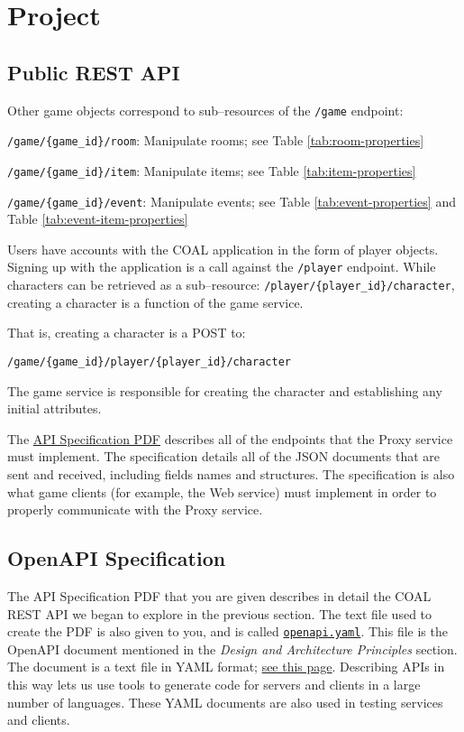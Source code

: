\documentclass{article}
\newcommand{\enterProblemHeader}[1]{
}
\newcommand{\exitProblemHeader}[1]{
\nobreak\extramarks{#1}{}\nobreak
}
\newcounter{homeworkProblemCounter} %
\newcommand{\homeworkProblemName}{}
\newenvironment{homeworkProblem}[1][Problem \arabic{homeworkProblemCounter}]{ %
\stepcounter{homeworkProblemCounter} %
\renewcommand{\homeworkProblemName}{#1} %
\section{\homeworkProblemName} %
\enterProblemHeader{\homeworkProblemName} %
}{
\exitProblemHeader{\homeworkProblemName} %
}
\newcommand{\homeworkSectionName}{}
\newenvironment{homeworkSection}[1]{ %
\renewcommand{\homeworkSectionName}{#1} %
\subsection{\homeworkSectionName} %
\enterProblemHeader{\homeworkProblemName\ [\homeworkSectionName]} %
}{
\enterProblemHeader{\homeworkProblemName} %
}
\begin{document}
\begin{homeworkProblem}[Project]
\begin{homeworkSection}{Public REST API}
	Other game objects correspond to sub--resources of the \texttt{/game} endpoint:
	\begin{compactitem}
		\item \texttt{/game/\{game\_id\}/room}: Manipulate rooms; see Table \ref{tab:room-properties}
		\item \texttt{/game/\{game\_id\}/item}: Manipulate items; see Table \ref{tab:item-properties}
		\item \texttt{/game/\{game\_id\}/event}: Manipulate events; see Table \ref{tab:event-properties} and Table \ref{tab:event-item-properties}
	\end{compactitem}
	
	Users have accounts with the COAL application in the form of player objects. Signing up with the application is a call against the \texttt{/player} endpoint. While characters can be retrieved as a sub--resource: \texttt{/player/\{player\_id\}/character}, creating a character is a function of the game service. 
	
	That is, creating a character is a POST to:
	 
	\texttt{/game/\{game\_id\}/player/\{player\_id\}/character} 
	
	The game service is responsible for creating the character and establishing any initial attributes.

	The \href{https://github.com/cp490-kdivision/cp490-specs/blob/main/coal-public-api-spec.pdf}{API Specification PDF} describes all of the endpoints that the Proxy service must implement. The specification details all of the JSON documents that are sent and received, including fields names and structures. The specification is also what game clients (for example, the Web service) must implement in order to properly communicate with the Proxy service.
\end{homeworkSection}

\begin{homeworkSection}{OpenAPI Specification}
	The API Specification PDF that you are given describes in detail the COAL REST API we began to explore in the previous section. The text file used to create the PDF is also given to you, and is called \href{https://github.com/cp490-kdivision/cp490-specs/blob/main/openapi.yaml}{\texttt{openapi.yaml}}. This file is the OpenAPI document mentioned in the \textit{Design and Architecture Principles} section. The document is a text file in YAML format; \href{https://en.wikipedia.org/wiki/YAML}{see this page}. Describing APIs in this way lets us use tools to generate code for servers and clients in a large number of languages. These YAML documents are also used in testing services and clients.


\end{homeworkSection}
\end{homeworkProblem}
\end{document}
